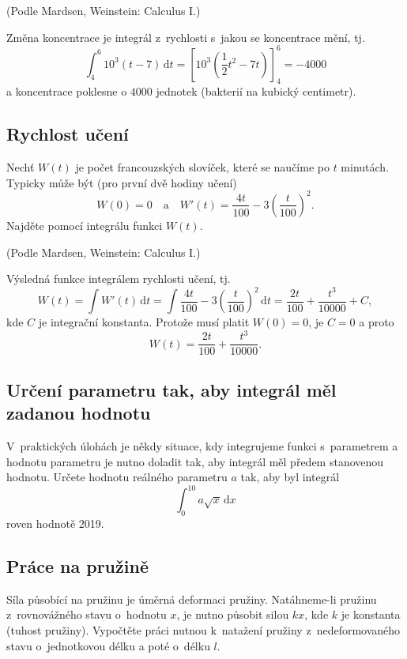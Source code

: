 (Podle Mardsen, Weinstein: Calculus I.)

\reseni
Změna koncentrace je integrál z rychlosti s jakou se koncentrace mění, tj. 
\begin{equation*}
  \int_4^6 10^3(t-7)\,\mathrm dt= \left[10^3\left (\frac 12 t^2-7t\right)\right]_4^6=-4000
\end{equation*}
a koncentrace poklesne o $4000$ jednotek (bakterií na kubický centimetr).
\konec

\stranka


\subsection{Rychlost učení} Nechť $W(t)$ je počet francouzských slovíček,
které se naučíme po $t$ minutách. Typicky může být (pro první dvě hodiny učení)
$$W(0)=0\quad \text {a} \quad W'(t)=\frac{4t}{100}-3\left (\frac  t{100}\right)^2.$$ Najděte pomocí integrálu funkci $W(t)$.

(Podle Mardsen, Weinstein: Calculus I.)

\reseni Výsledná funkce integrálem rychlosti učení, tj.
\begin{equation*}
W(t)=\int W'(t) \,\mathrm dt  =  \int \frac{4t}{100}-3\left (\frac  t{100}\right)^2 \,\mathrm dt  =\frac {2t}{100}+\frac{t^3}{10000} +C,
\end{equation*}
kde $C$ je integrační konstanta. Protože musí platit $W(0)=0$, je $C=0$ a proto
\begin{equation*}
  W(t)=\frac {2t}{100}+\frac{t^3}{10000}.
\end{equation*}

\konec


\stranka

\subsection{Určení parametru tak, aby integrál měl zadanou hodnotu}
V praktických úlohách je někdy situace, kdy integrujeme funkci s parametrem a hodnotu parametru je nutno doladit tak, aby integrál měl
předem stanovenou hodnotu.  Určete hodnotu reálného parametru $a$ tak,
aby byl integrál $$\int_0^{10} a \sqrt x\,\mathrm dx$$ roven hodnotě
2019.


\stranka

\subsection{Práce na pružině} Síla působící na pružinu je úměrná
deformaci pružiny. Natáhneme-li pružinu z rovnovážného stavu o hodnotu
$x$, je nutno působit silou $kx$, kde $k$ je konstanta (tuhost
pružiny). Vypočtěte práci nutnou k natažení pružiny z nedeformovaného
stavu o jednotkovou délku a poté o délku $l$.

